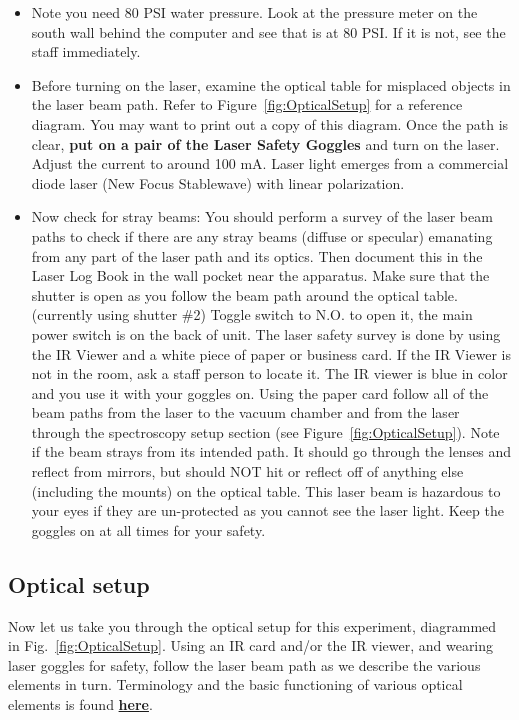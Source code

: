 \documentclass{../lab}
\begin{document}
\begin{itemize}
    \item Note you need 80 PSI water pressure. Look at the pressure meter on the south wall behind the computer and see that is at 80 PSI.  If it is not, see the staff immediately.

    \item Before turning on the laser, examine the optical table for misplaced objects in the laser beam path. Refer to Figure~\ref{fig:OpticalSetup} for a reference diagram. You may want to print out a copy of this diagram. Once the path is clear, \textbf{put on a pair of the Laser Safety Goggles} and turn on the laser. Adjust the current to around 100 mA. Laser light emerges from a commercial diode laser (New Focus Stablewave) with linear polarization.

    \item Now check for stray beams: You should perform a survey of the laser beam paths to check if there are any stray beams (diffuse or specular) emanating from any part of the laser path and its optics. Then document this in the Laser Log Book in the wall pocket near the apparatus. Make sure that the shutter is open as you follow the beam path around the optical table. (currently using shutter \#2) Toggle switch to N.O. to open it, the main power switch is on the back of unit. The laser safety survey is done by using the IR Viewer and a white piece of paper or business card. If the IR Viewer is not in the room, ask a staff person to locate it. The IR viewer is blue in color and you use it with your goggles on. Using the paper card follow all of the beam paths from the laser to the vacuum chamber and from the laser through the spectroscopy setup section (see Figure~\ref{fig:OpticalSetup}). Note if the beam strays from its intended path. It should go through the lenses and reflect from mirrors, but should NOT hit or reflect off of anything else (including the mounts) on the optical table. This laser beam is hazardous to your eyes if they are un-protected as you cannot see the laser light. Keep the goggles on at all times for your safety.
    
\end{itemize}

\subsection{Optical setup}

Now let us take you through the optical setup for this experiment, diagrammed in Fig.\ \ref{fig:OpticalSetup}.  Using an IR card and/or the IR viewer, and wearing laser goggles for safety, follow the laser beam path as we describe the various elements in turn.  Terminology and the basic functioning of various optical elements is found \href{http://experimentationlab.berkeley.edu/sites/default/files/Definitions\%20for\%20MOT.pdf}{\textbf{here}}.
\end{document}
